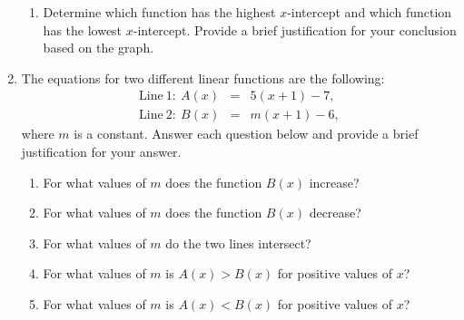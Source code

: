 \begin{enumerate}
\begin{enumerate}
    \item Determine which function has the highest $x$-intercept
    and which function has the lowest $x$-intercept. Provide a brief
    justification for your conclusion based on the graph.

  \end{enumerate}

\item The equations for two different linear functions are the
  following:
  \begin{eqnarray*}
    \mathrm{Line~1:~} A(x) & = & 5(x+1)-7, \\
    \mathrm{Line~2:~} B(x) & = & m(x+1)-6,
  \end{eqnarray*}
  where $m$ is a constant. Answer each question below and provide
  a brief justification for your answer.

  \begin{enumerate}
  \item For what values of $m$ does the function $B(x)$ increase?
  \item For what values of $m$ does the function $B(x)$ decrease?
  \item For what values of $m$ do the two lines intersect?
  \item For what values of $m$ is $A(x)>B(x)$ for positive values of
    $x$?
  \item For what values of $m$ is $A(x)<B(x)$ for positive values of
    $x$?
  \end{enumerate}

\end{enumerate}
